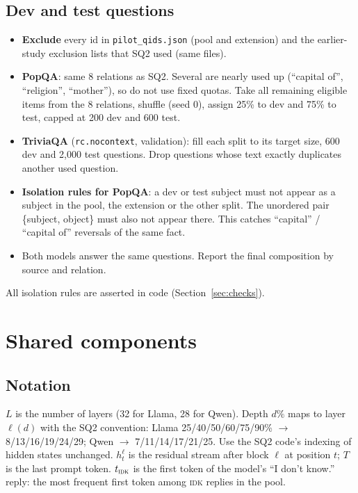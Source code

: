 \documentclass[11pt]{article}
\newcommand{\IDK}{\textsc{idk}}
\begin{document}
\subsection{Dev and test questions}
\begin{itemize}
  \item \textbf{Exclude} every id in \texttt{pilot\_qids.json} (pool and extension) and the earlier-study
        exclusion lists that SQ2 used (same files).
  \item \textbf{PopQA}: same 8 relations as SQ2. Several are nearly used up (``capital of'', ``religion'',
        ``mother''), so do not use fixed quotas. Take all remaining eligible items from the 8 relations,
        shuffle (seed 0), assign 25\% to dev and 75\% to test, capped at 200 dev and 600 test.
  \item \textbf{TriviaQA} (\texttt{rc.nocontext}, validation): fill each split to its target size,
        600 dev and 2,000 test questions. Drop questions whose text exactly duplicates another used question.
  \item \textbf{Isolation rules for PopQA}: a dev or test subject must not appear as a subject in the pool,
        the extension or the other split. The unordered pair \{subject, object\} must also not appear there.
        This catches ``capital'' / ``capital of'' reversals of the same fact.
  \item Both models answer the same questions. Report the final composition by source and relation.
\end{itemize}
All isolation rules are asserted in code (Section~\ref{sec:checks}).

\section{Shared components}

\subsection{Notation}
$L$ is the number of layers (32 for Llama, 28 for Qwen). Depth $d\%$ maps to layer $\ell(d)$ with the SQ2
convention: Llama 25/40/50/60/75/90\% $\to$ 8/13/16/19/24/29; Qwen $\to$ 7/11/14/17/21/25. Use the SQ2
code's indexing of hidden states unchanged. $h^{\ell}_t$ is the residual stream after block $\ell$ at
position $t$; $T$ is the last prompt token. $t_{\IDK}$ is the first token of the model's ``I don't know.''
reply: the most frequent first token among \IDK{} replies in the pool.
\end{document}
